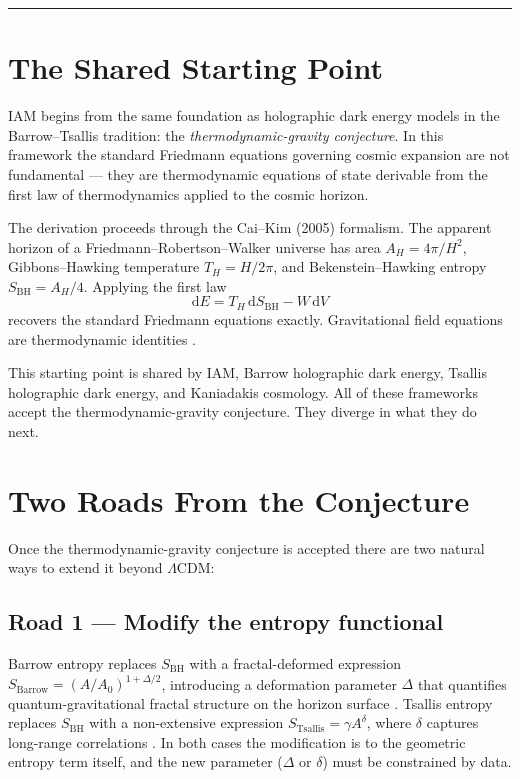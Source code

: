 \documentclass[12pt]{article}
\newcommand{\Sbh}{S_\mathrm{BH}}
\newcommand{\THawk}{T_H}
\newcommand{\AHawk}{A_H}
\newcommand{\LCDM}{$\Lambda$CDM}
\begin{document}
\vspace{4pt}
{\color{iamblue}\rule{\linewidth}{0.6pt}}
\vspace{8pt}

\section{The Shared Starting Point}

IAM begins from the same foundation as holographic dark energy models in the
Barrow--Tsallis tradition: the \emph{thermodynamic-gravity conjecture}.  In this
framework the standard Friedmann equations governing cosmic expansion are not
fundamental --- they are thermodynamic equations of state derivable from the first
law of thermodynamics applied to the cosmic horizon.

The derivation proceeds through the Cai--Kim (2005) formalism.  The apparent horizon
of a Friedmann--Robertson--Walker universe has area $\AHawk = 4\pi/H^2$,
Gibbons--Hawking temperature $\THawk = H/2\pi$, and Bekenstein--Hawking entropy
$\Sbh = \AHawk/4$.  Applying the first law
\begin{equation}
  \mathrm{d}E = \THawk\,\mathrm{d}\Sbh - W\,\mathrm{d}V
  \label{eq:first_law}
\end{equation}
recovers the standard Friedmann equations exactly.  Gravitational field equations
are thermodynamic identities \citep{Jacobson1995}.

This starting point is shared by IAM, Barrow holographic dark energy, Tsallis
holographic dark energy, and Kaniadakis cosmology.  All of these frameworks accept
the thermodynamic-gravity conjecture.  They diverge in what they do next.

\section{Two Roads From the Conjecture}

Once the thermodynamic-gravity conjecture is accepted there are two natural ways to
extend it beyond \LCDM:

\subsection{Road 1 --- Modify the entropy functional}

Barrow entropy replaces $\Sbh$ with a fractal-deformed expression
$S_\mathrm{Barrow} = (A/A_0)^{1+\Delta/2}$, introducing a deformation parameter
$\Delta$ that quantifies quantum-gravitational fractal structure on the horizon
surface \citep{Saridakis2020barrow}.  Tsallis entropy replaces $\Sbh$ with a
non-extensive expression $S_\mathrm{Tsallis} = \gamma A^\delta$, where $\delta$
captures long-range correlations \citep{Saridakis2018tsallis}.  In both cases the
modification is to the geometric entropy term itself, and the new parameter
($\Delta$ or $\delta$) must be constrained by data.
\end{document}
